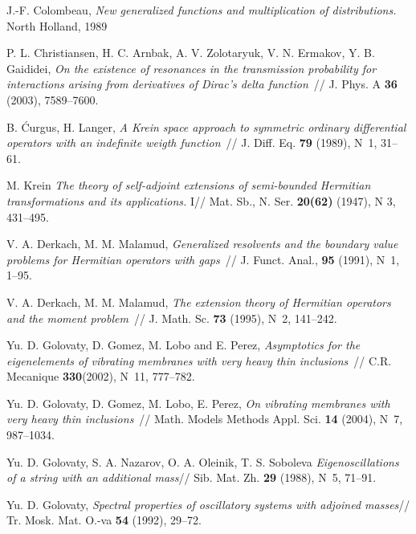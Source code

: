 \documentclass[11pt,english]{amsart}%
\begin{document}
\begin{thebibliography}{99}
 J.-F. Colombeau, \textit{New generalized functions and multiplication
of distributions.} North Holland, 1989

P. L. Christiansen, H. C. Arnbak, A. V. Zolotaryuk, V. N. Ermakov, Y. B. Gaididei,
\textit{On the existence of resonances in the transmission probability for interactions
arising from derivatives of Dirac's delta function}~// J. Phys. A \textbf{36} (2003),
7589--7600.

 B. \'{C}urgus, H. Langer,
\textit{A Krein space approach to symmetric ordinary differential operators with
    an indefinite weigth function}~// J. Diff. Eq. \textbf{79} (1989), N~1, 31--61.



M. Krein \textit{The theory of self-adjoint extensions of semi-bounded Hermitian
    transformations and its applications. } I// Mat. Sb., N. Ser. \textbf{20(62)} (1947), N 3, 431--495.




V. A. Derkach, M. M. Malamud, \textit{Generalized resolvents and the boundary value
problems for Hermitian operators with gaps}~// J. Funct. Anal., \textbf{95} (1991), N~1,
1--95.

V. A. Derkach, M. M. Malamud, \textit{ The extension theory of Hermitian operators and the
moment problem}~// J. Math. Sc. \textbf{73} (1995), N~2, 141--242.

Yu. D. Golovaty, D. Gomez, M. Lobo and E. Perez, \textit{Asymptotics for the eigenelements
of vibrating membranes with very heavy thin inclusions}~// C.R. Mecanique
\textbf{330}(2002), N~11, 777--782.

Yu. D. Golovaty, D. Gomez, M. Lobo, E. Perez, \textit{On vibrating membranes with very
heavy thin inclusions}~// Math. Models Methods Appl. Sci. \textbf{14} (2004), N~7,
987--1034.

Yu. D. Golovaty, S. A. Nazarov, O. A. Oleinik, T. S. Soboleva \textit{ Eigenoscillations of a string with an additional mass}// Sib. Mat. Zh. \textbf{29} (1988), N~5, 71--91.



Yu. D. Golovaty,  \textit{Spectral properties of oscillatory systems with adjoined masses}// Tr. Mosk. Mat. O.-va \textbf{54} (1992), 29--72.




\end{thebibliography}
\end{document}
